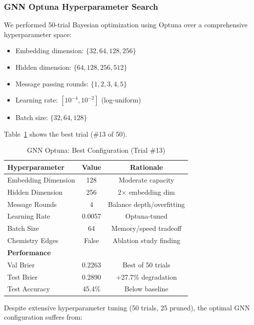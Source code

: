\subsubsection{GNN Optuna Hyperparameter Search}

We performed 50-trial Bayesian optimization using Optuna \citep{akiba2019optuna} over a comprehensive hyperparameter space:

\begin{itemize}
    \item Embedding dimension: $\{32, 64, 128, 256\}$
    \item Hidden dimension: $\{64, 128, 256, 512\}$
    \item Message passing rounds: $\{1, 2, 3, 4, 5\}$
    \item Learning rate: $[10^{-4}, 10^{-2}]$ (log-uniform)
    \item Batch size: $\{32, 64, 128\}$
\end{itemize}

Table~\ref{tab:gnn-optuna-best} shows the best trial (\#13 of 50).

\begin{table}[htbp]
\centering
\caption{GNN Optuna: Best Configuration (Trial \#13)}
\label{tab:gnn-optuna-best}
\begin{tabular}{lcc}
\toprule
\textbf{Hyperparameter} & \textbf{Value} & \textbf{Rationale} \\
\midrule
Embedding Dimension & 128 & Moderate capacity \\
Hidden Dimension & 256 & 2$\times$ embedding dim \\
Message Rounds & 4 & Balance depth/overfitting \\
Learning Rate & 0.0057 & Optuna-tuned \\
Batch Size & 64 & Memory/speed tradeoff \\
Chemistry Edges & False & Ablation study finding \\
\midrule
\multicolumn{3}{l}{\textbf{Performance}} \\
Val Brier & 0.2263 & Best of 50 trials \\
Test Brier & 0.2890 & +27.7\% degradation \\
Test Accuracy & 45.4\% & Below baseline \\
\bottomrule
\end{tabular}
\end{table}

Despite extensive hyperparameter tuning (50 trials, 25 pruned), the optimal GNN configuration suffers from:

